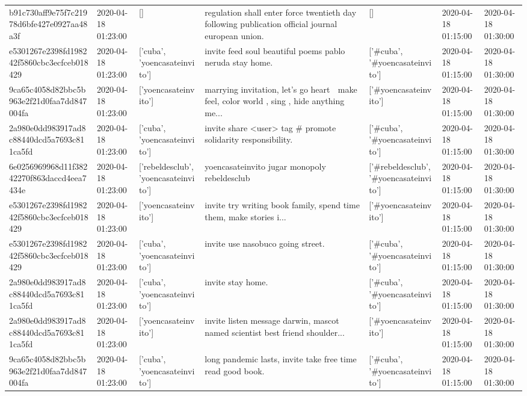\begin{tabular}{lllllll}
b91c730aff9e75f7c21978d6bfe427e0927aa48a3f & 2020-04-18 01:23:00 & [] & regulation shall enter force twentieth day following publication official journal european union. & [] & 2020-04-18 01:15:00 & 2020-04-18 01:30:00 \\
e5301267e2398fd198242f5860cbc3ecfceb018429 & 2020-04-18 01:23:00 & ['cuba', 'yoencasateinvito'] & invite feed soul beautiful poems pablo neruda stay home. & ['#cuba', '#yoencasateinvito'] & 2020-04-18 01:15:00 & 2020-04-18 01:30:00 \\
9ca65c4058d82bbc5b963e2f21d0faa7dd847004fa & 2020-04-18 01:23:00 & ['yoencasateinvito'] & marrying invitation, let's go heart 💖 make feel, color world , sing , hide anything me... & ['#yoencasateinvito'] & 2020-04-18 01:15:00 & 2020-04-18 01:30:00 \\
2a980e0dd983917ad8c88440dcd5a7693c811ca5fd & 2020-04-18 01:23:00 & ['cuba', 'yoencasateinvito'] & invite share <user> tag \# promote solidarity responsibility. & ['#cuba', '#yoencasateinvito'] & 2020-04-18 01:15:00 & 2020-04-18 01:30:00 \\
6e0256969968d11f38242270f863daccd4eea7434e & 2020-04-18 01:23:00 & ['rebeldesclub', 'yoencasateinvito'] & yoencasateinvito jugar monopoly rebeldesclub & ['#rebeldesclub', '#yoencasateinvito'] & 2020-04-18 01:15:00 & 2020-04-18 01:30:00 \\
e5301267e2398fd198242f5860cbc3ecfceb018429 & 2020-04-18 01:23:00 & ['yoencasateinvito'] & invite try writing book family, spend time them, make stories i... & ['#yoencasateinvito'] & 2020-04-18 01:15:00 & 2020-04-18 01:30:00 \\
e5301267e2398fd198242f5860cbc3ecfceb018429 & 2020-04-18 01:23:00 & ['cuba', 'yoencasateinvito'] & invite use nasobuco going street. & ['#cuba', '#yoencasateinvito'] & 2020-04-18 01:15:00 & 2020-04-18 01:30:00 \\
2a980e0dd983917ad8c88440dcd5a7693c811ca5fd & 2020-04-18 01:23:00 & ['cuba', 'yoencasateinvito'] & invite stay home. & ['#cuba', '#yoencasateinvito'] & 2020-04-18 01:15:00 & 2020-04-18 01:30:00 \\
2a980e0dd983917ad8c88440dcd5a7693c811ca5fd & 2020-04-18 01:23:00 & ['yoencasateinvito'] & invite listen message darwin, mascot named scientist best friend shoulder... & ['#yoencasateinvito'] & 2020-04-18 01:15:00 & 2020-04-18 01:30:00 \\
9ca65c4058d82bbc5b963e2f21d0faa7dd847004fa & 2020-04-18 01:23:00 & ['cuba', 'yoencasateinvito'] & long pandemic lasts, invite take free time read good book. & ['#cuba', '#yoencasateinvito'] & 2020-04-18 01:15:00 & 2020-04-18 01:30:00 \\

\end{tabular}
